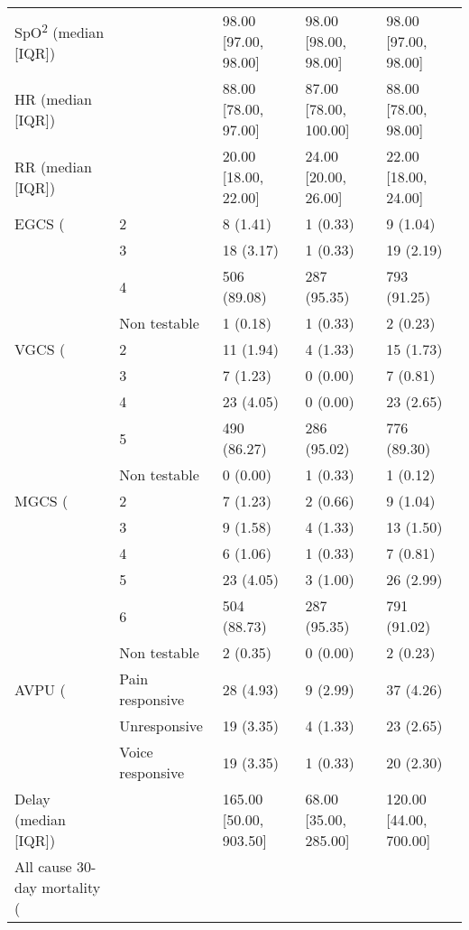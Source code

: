\documentclass[10pt,letterpaper]{article}\usepackage[]{graphicx}\usepackage[]{color}
\begin{document}
\begin{table}[ht]
\begin{tabular}{lllll}
  SpO\textsuperscript{2} (median [IQR]) &  & 98.00 [97.00, 98.00] & 98.00 [98.00, 98.00] & 98.00 [97.00, 98.00] \\ 
  HR (median [IQR]) &  & 88.00 [78.00, 97.00] & 87.00 [78.00, 100.00] & 88.00 [78.00, 98.00] \\ 
  RR (median [IQR]) &  & 20.00 [18.00, 22.00] & 24.00 [20.00, 26.00] & 22.00 [18.00, 24.00] \\ 
  EGCS (%
   & 2 & 8 (1.41) & 1 (0.33) & 9 (1.04) \\ 
   & 3 & 18 (3.17) & 1 (0.33) & 19 (2.19) \\ 
   & 4 & 506 (89.08) & 287 (95.35) & 793 (91.25) \\ 
   & Non testable & 1 (0.18) & 1 (0.33) & 2 (0.23) \\ 
  VGCS (%
   & 2 & 11 (1.94) & 4 (1.33) & 15 (1.73) \\ 
   & 3 & 7 (1.23) & 0 (0.00) & 7 (0.81) \\ 
   & 4 & 23 (4.05) & 0 (0.00) & 23 (2.65) \\ 
   & 5 & 490 (86.27) & 286 (95.02) & 776 (89.30) \\ 
   & Non testable & 0 (0.00) & 1 (0.33) & 1 (0.12) \\ 
  MGCS (%
   & 2 & 7 (1.23) & 2 (0.66) & 9 (1.04) \\ 
   & 3 & 9 (1.58) & 4 (1.33) & 13 (1.50) \\ 
   & 4 & 6 (1.06) & 1 (0.33) & 7 (0.81) \\ 
   & 5 & 23 (4.05) & 3 (1.00) & 26 (2.99) \\ 
   & 6 & 504 (88.73) & 287 (95.35) & 791 (91.02) \\ 
   & Non testable & 2 (0.35) & 0 (0.00) & 2 (0.23) \\ 
  AVPU (%
   & Pain responsive & 28 (4.93) & 9 (2.99) & 37 (4.26) \\ 
   & Unresponsive & 19 (3.35) & 4 (1.33) & 23 (2.65) \\ 
   & Voice responsive & 19 (3.35) & 1 (0.33) & 20 (2.30) \\ 
  Delay (median [IQR]) &  & 165.00 [50.00, 903.50] & 68.00 [35.00, 285.00] & 120.00 [44.00, 700.00] \\ 
  All cause 30-day mortality (%

\end{tabular}
\end{table}
\end{document}
